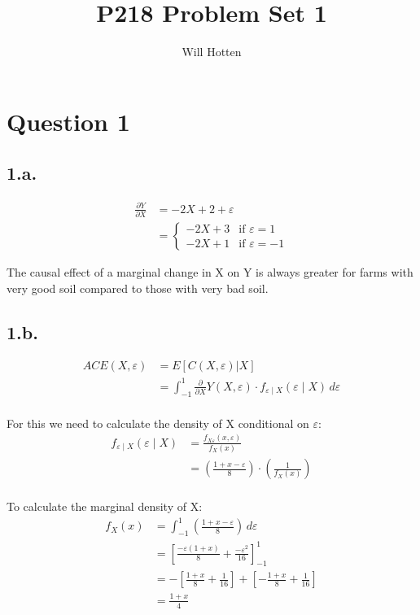 \documentclass{article}
\begin{document}
\title{P218 Problem Set 1}
\author{Will Hotten}
\date{}
\maketitle

\section*{Question 1}

\subsection*{1.a.}
\begin{align*}
    \frac{\partial Y}{\partial X} 
    &= -2X + 2 + \varepsilon\\
    &=\left\{ \begin{array}{cl} -2X + 3 & \textrm{if }\varepsilon= 1\\
    -2X + 1 & \textrm{if }\varepsilon=-1 \end {array}\right.
\end{align*}

The causal effect of a marginal change in X on Y is always greater for farms with very good soil compared to those with very bad soil.

\subsection*{1.b.}
\begin{align*}
    ACE(X, \varepsilon)
    &= E[C(X, \varepsilon)|X]\\
    &= \int_{-1}^{1} \frac{\partial}{\partial X}Y(X,\varepsilon)
    \cdot f_{\varepsilon \mid X}(\varepsilon \mid X) \,d\varepsilon
    \\
\end{align*}

For this we need to calculate the density of X conditional on $\varepsilon$:
\begin{align*}
    f_{\varepsilon \mid X}(\varepsilon \mid X)
    &= \frac{f_{X\varepsilon}(x,\varepsilon)}{f_{X}(x)}\\
    &= \left(\frac{1+x-\varepsilon}{8}\right)\cdot\left(\frac{1}{f_{X}(x)}\right)
    \\
\end{align*}

To calculate the marginal density of X:
\begin{align*}
    f_{X}(x)
    &=\int_{-1}^{1}\left(\frac{1+x-\varepsilon}{8}\right) \,d\varepsilon \\
    &=\left[\frac{-\varepsilon(1+x)}{8}+\frac{-\varepsilon^2}{16}\right]_{-1}^{1}\\
    &=-\left[\frac{1+x}{8} + \frac{1}{16}\right]
    + \left[-\frac{1+x}{8} + \frac{1}{16}\right]\\
    &= \frac{1+x}{4}
\end{align*}
\end{document}
